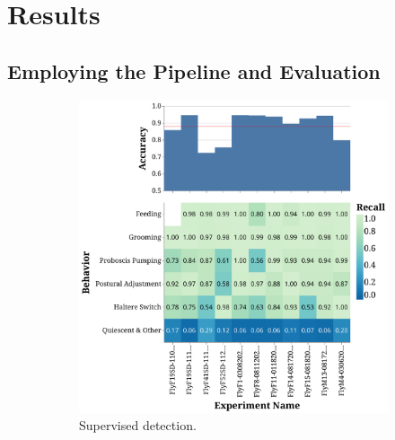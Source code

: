 \chapter{Results}

\section{Employing the Pipeline and  Evaluation}\label{section:employing-proposed-pipeline}

\begin{figure}[ht!]
	\centering
	\begin{subfigure}[ht!]{0.495\linewidth}
		\centering\includegraphics[width=\linewidth]{figures/OutliningPerformance-Supervised.pdf}
		\caption{Supervised detection.}
	\end{subfigure}%
	\hfill
	\begin{subfigure}[ht!]{0.495\linewidth}

\end{subfigure}
\end{figure}
